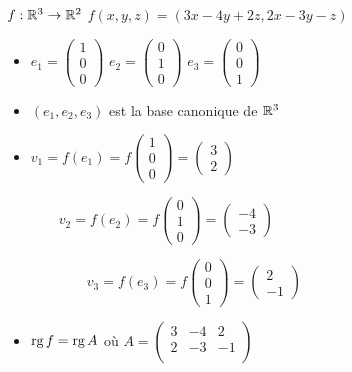 \begin{frame}
\begin{exemple}
$f : \mathbb{R}^3 \to \mathbb{R}^2$ \qquad $f(x,y,z) = (3x-4y+2z,2x-3y-z)$
\pause
\begin{itemize}
  \item $e_1 = \left(\begin{smallmatrix} 1 \\ 0 \\ 0 \end{smallmatrix}\right)$ \quad 
$e_2=\left(\begin{smallmatrix} 0 \\ 1 \\ 0 \end{smallmatrix}\right)$ \quad
$e_3=\left(\begin{smallmatrix} 0 \\ 0 \\ 1 \end{smallmatrix}\right)$
\pause
  \item $(e_1,e_2,e_3)$ est la base canonique de $\mathbb{R}^3$
\pause  
  \item $v_1 = f(e_1) = f\left(\begin{smallmatrix} 1 \\ 0 \\ 0\end{smallmatrix}\right) 
= \left(\begin{smallmatrix} 3 \\ 2 \end{smallmatrix}\right)$

\pause
$\qquad
v_2 = f(e_2) = f\left(\begin{smallmatrix} 0 \\ 1 \\ 0\end{smallmatrix}\right) 
= \left(\begin{smallmatrix} -4 \\ -3 \end{smallmatrix}\right)$

\pause
$\qquad\qquad v_3 = f(e_3) = f\left(\begin{smallmatrix} 0 \\ 0 \\ 1 \end{smallmatrix}\right) 
= \left(\begin{smallmatrix} 2 \\ -1 \end{smallmatrix}\right)
$

\pause
  \item $\mathop{\text{rg}}\nolimits f = \mathop{\text{rg}}\nolimits A$ où $A = \begin{pmatrix}
3 & -4 & 2 \\
2 & -3 & -1 \\
\end{pmatrix}$


\end{itemize}
\end{exemple}
\end{frame}
